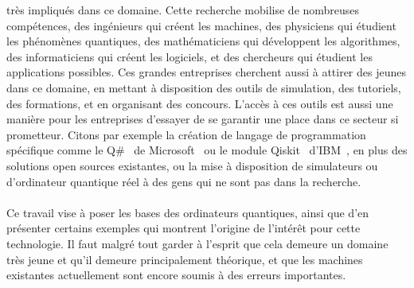 très impliqués dans ce domaine.
Cette recherche mobilise de nombreuses compétences, des ingénieurs qui créent les machines,
des physiciens qui étudient les phénomènes quantiques, des mathématiciens qui développent les algorithmes,
des informaticiens qui créent les logiciels, et des chercheurs qui étudient les applications possibles.
Ces grandes entreprises cherchent aussi à attirer des jeunes dans ce domaine, en mettant à
disposition des outils de simulation, des tutoriels, des formations, et en organisant des concours.
L'accès à ces outils est aussi une manière pour les entreprises d'essayer de se garantir une place
dans ce secteur si prometteur.
Citons par exemple la création de langage de programmation spécifique comme le Q\#~\cite{microsoft-qsharp} de Microsoft~\cite{microsoft-quantum} ou le
module Qiskit~\cite{qiskit-web} d'IBM~\cite{ibm-quantum-web}, en plus des solutions open sources existantes, ou la mise à disposition de
simulateurs ou d'ordinateur quantique réel à des gens qui ne sont pas dans la recherche.\\ \\
Ce travail vise à poser les bases des ordinateurs quantiques, ainsi que d'en présenter
certains exemples qui montrent l'origine de l'intérêt pour cette technologie.
Il faut malgré tout garder à l'esprit que cela demeure un domaine très jeune et qu'il demeure principalement
théorique, et que les machines existantes actuellement sont encore soumis à des erreurs importantes.
